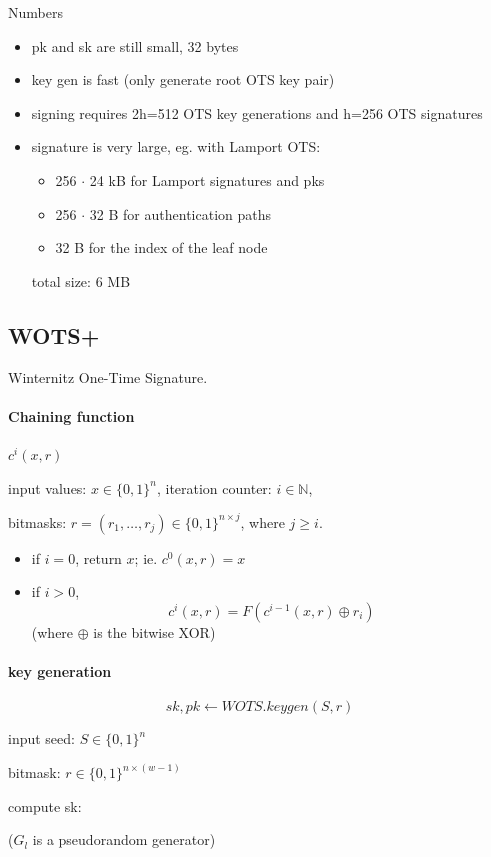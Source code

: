 \documentclass{article}
\theoremstyle{definition}
\begin{document}
Numbers
\begin{itemize}
    \item pk and sk are still small, 32 bytes
    \item key gen is fast (only generate root OTS key pair)
    \item signing requires 2h=512 OTS key generations and h=256 OTS signatures
    \item signature is very large, eg. with Lamport OTS:
	\begin{itemize}
	    \item 256 $\cdot$ 24 kB for Lamport signatures and pks
	    \item 256 $\cdot$ 32 B for authentication paths
	    \item 32 B for the index of the leaf node
	\end{itemize}
	total size: 6 MB
\end{itemize}


\subsection{WOTS+}
Winternitz One-Time Signature.

\paragraph{Chaining function} $c^i(x,r)$

input values: $x \in \{0,1\}^n$, iteration counter: $i \in \mathbb{N}$,

bitmasks: $r=(r_1, \ldots, r_j) \in \{0,1\}^{n \times j}$, where $j \geq i$.

\begin{itemize}
    \item if $i=0$, return $x$; ie. $c^0(x,r)=x$
    \item if $i>0$,
	$$c^i(x,r)=  F(c^{i-1}(x,r) \oplus r_i)$$
	(where $\oplus$ is the bitwise XOR)
\end{itemize}

\paragraph{key generation}

$$sk, pk \leftarrow WOTS.keygen(S,r)$$

input seed: $S \in \{0,1\}^n$

bitmask: $r \in \{0,1\}^{n \times (w-1)}$

compute sk:

($G_l$ is a pseudorandom generator)
\end{document}
